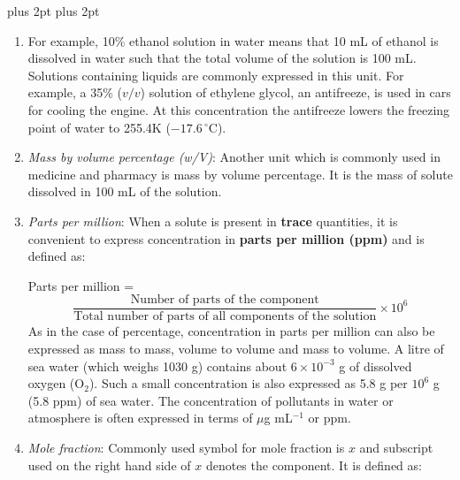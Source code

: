 \documentclass[11pt,a4paper]{article}
\renewcommand{\normalsize}{\fontsize{10.5bp}{12.7bp}\selectfont\abovedisplayskip=4pt plus 2pt\belowdisplayskip=4pt plus 2pt\abovedisplayshortskip=2pt\belowdisplayshortskip=2pt}
\begin{document}
\normalsize


\noindent\hfill\begin{minipage}[t]{0.77\textwidth}
\begin{enumerate}[label=(\roman*),leftmargin=24pt,itemsep=3pt,topsep=0pt,start=3]
\item[] For example, 10\% ethanol solution in water means that 10 mL of ethanol is dissolved in water such that the total volume of the solution is 100 mL. Solutions containing liquids are commonly expressed in this unit. For example, a 35\% ($v/v$) solution of ethylene glycol, an antifreeze, is used in cars for cooling the engine. At this concentration the antifreeze lowers the freezing point of water to 255.4K ($-17.6\,^\circ$C).
\item \textit{Mass by volume percentage (w/V)}: Another unit which is commonly used in medicine and pharmacy is mass by volume percentage. It is the mass of solute dissolved in 100 mL of the solution.
\item \textit{Parts per million}: When a solute is present in \textbf{trace} quantities, it is convenient to express concentration in \textbf{parts per million (ppm)} and is defined as:

Parts per million =
\[ \frac{\text{Number of parts of the component}}{\text{Total number of parts of all components of the solution}} \times 10^{6} \tag{1.3} \]
As in the case of percentage, concentration in parts per million can also be expressed as mass to mass, volume to volume and mass to volume. A litre of sea water (which weighs 1030 g) contains about $6 \times 10^{-3}$ g of dissolved oxygen (O$_2$). Such a small concentration is also expressed as 5.8 g per $10^{6}$ g (5.8 ppm) of sea water. The concentration of pollutants in water or atmosphere is often expressed in terms of $\mu$g mL$^{-1}$ or ppm.
\item \textit{Mole fraction}: Commonly used symbol for mole fraction is $x$ and subscript used on the right hand side of $x$ denotes the component. It is defined as:


\end{enumerate}
\end{minipage}
\end{document}
